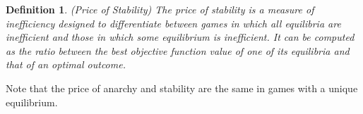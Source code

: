 \documentclass{article}
\newtheorem{definition}{Definition}
\begin{document}
\begin{definition}
(Price of Stability) The price of stability is a measure of inefficiency designed to differentiate between games in which all equilibria are inefficient and those in which some equilibrium is inefficient. It can be computed as the ratio between the best objective function value of one of its equilibria and that of an optimal outcome.
\end{definition}

Note that the price of anarchy and stability are the same in games with a unique equilibrium.



\end{document}
